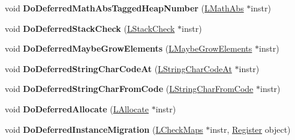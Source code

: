 \begin{DoxyCompactItemize}
\item 
void {\bfseries Do\+Deferred\+Math\+Abs\+Tagged\+Heap\+Number} (\hyperlink{classv8_1_1internal_1_1_l_math_abs}{L\+Math\+Abs} $\ast$instr)\hypertarget{classv8_1_1internal_1_1_l_code_gen_aa6e5b6dba176a4572ce81dcc27b057aa}{}\label{classv8_1_1internal_1_1_l_code_gen_aa6e5b6dba176a4572ce81dcc27b057aa}

\item 
void {\bfseries Do\+Deferred\+Stack\+Check} (\hyperlink{classv8_1_1internal_1_1_l_stack_check}{L\+Stack\+Check} $\ast$instr)\hypertarget{classv8_1_1internal_1_1_l_code_gen_a273730f2504ea249d9deb8dde7b314ee}{}\label{classv8_1_1internal_1_1_l_code_gen_a273730f2504ea249d9deb8dde7b314ee}

\item 
void {\bfseries Do\+Deferred\+Maybe\+Grow\+Elements} (\hyperlink{classv8_1_1internal_1_1_l_maybe_grow_elements}{L\+Maybe\+Grow\+Elements} $\ast$instr)\hypertarget{classv8_1_1internal_1_1_l_code_gen_afe319c35fc8adaff35f3417fb7c833d6}{}\label{classv8_1_1internal_1_1_l_code_gen_afe319c35fc8adaff35f3417fb7c833d6}

\item 
void {\bfseries Do\+Deferred\+String\+Char\+Code\+At} (\hyperlink{classv8_1_1internal_1_1_l_string_char_code_at}{L\+String\+Char\+Code\+At} $\ast$instr)\hypertarget{classv8_1_1internal_1_1_l_code_gen_a6b229168338a73ef11c203f845b68cb4}{}\label{classv8_1_1internal_1_1_l_code_gen_a6b229168338a73ef11c203f845b68cb4}

\item 
void {\bfseries Do\+Deferred\+String\+Char\+From\+Code} (\hyperlink{classv8_1_1internal_1_1_l_string_char_from_code}{L\+String\+Char\+From\+Code} $\ast$instr)\hypertarget{classv8_1_1internal_1_1_l_code_gen_acf78c92290237e368a4b178f049afbc6}{}\label{classv8_1_1internal_1_1_l_code_gen_acf78c92290237e368a4b178f049afbc6}

\item 
void {\bfseries Do\+Deferred\+Allocate} (\hyperlink{classv8_1_1internal_1_1_l_allocate}{L\+Allocate} $\ast$instr)\hypertarget{classv8_1_1internal_1_1_l_code_gen_a5a708933d9b086e295c8bf902f66033e}{}\label{classv8_1_1internal_1_1_l_code_gen_a5a708933d9b086e295c8bf902f66033e}

\item 
void {\bfseries Do\+Deferred\+Instance\+Migration} (\hyperlink{classv8_1_1internal_1_1_l_check_maps}{L\+Check\+Maps} $\ast$instr, \hyperlink{structv8_1_1internal_1_1_register}{Register} object)\hypertarget{classv8_1_1internal_1_1_l_code_gen_a9a11a557dc4a35165efe7432b91cce0c}{}\label{classv8_1_1internal_1_1_l_code_gen_a9a11a557dc4a35165efe7432b91cce0c}


\end{DoxyCompactItemize}
